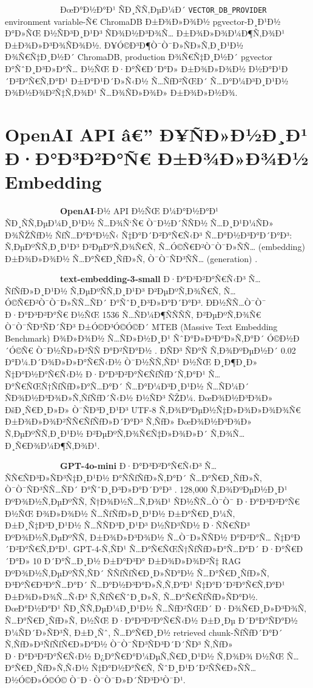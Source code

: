 \documentclass[12pt,A4]{report}
\begin{document}
\ \ \ \ \ \ \ \ \  \ \ \ \ ÐœÐ°Ð½Ð°Ð¹ ÑÐ¸ÑÑ‚ÐµÐ¼Ð´ \texttt{VECTOR\_DB\_PROVIDER}
environment variable-Ñ€ ChromaDB Ð±Ð¾Ð»Ð¾Ð½ pgvector-Ð¸Ð¹Ð½ Ð°Ð»ÑŒ Ð½ÑÐ³Ð¸Ð¹Ð³
ÑÐ¾Ð½Ð³Ð¾Ñ… Ð±Ð¾Ð»Ð¾Ð¼Ð¶Ñ‚Ð¾Ð¹ Ð±Ð¾Ð»Ð³Ð¾ÑÐ¾Ð½. Ð¥Ó©Ð³Ð¶Ò¯Ò¯Ð»ÑÐ»Ñ‚Ð¸Ð¹Ð½ Ð¾Ñ€Ñ‡Ð¸Ð½Ð´ ChromaDB,
production Ð¾Ñ€Ñ‡Ð¸Ð½Ð´ pgvector Ð°ÑˆÐ¸Ð³Ð»Ð°Ñ… Ð½ÑŒ Ð·Ð°Ñ€Ð´Ð°Ð» Ð±Ð¾Ð»Ð¾Ð½ Ð½Ð°Ð¹Ð´Ð²Ð°Ñ€Ñ‚Ð°Ð¹
Ð±Ð°Ð¹Ð´Ð»Ñ‹Ð½ Ñ…ÑƒÐ²ÑŒÐ´ Ñ…Ð°Ð¼Ð³Ð¸Ð¹Ð½ Ð¾Ð½Ð¾Ð²Ñ‡Ñ‚Ð¾Ð¹ Ñ…Ð¾ÑÐ»Ð¾Ð» Ð±Ð¾Ð»Ð½Ð¾.

\section{OpenAI API â€” Ð¥ÑÐ»Ð½Ð¸Ð¹ Ð·Ð°Ð³Ð²Ð°Ñ€ Ð±Ð¾Ð»Ð¾Ð½ Embedding}

\ \ \ \ \ \ \ \ \  \ \ \ \ \textbf{OpenAI}-Ð½ API Ð½ÑŒ Ð¼Ð°Ð½Ð°Ð¹ ÑÐ¸ÑÑ‚ÐµÐ¼Ð¸Ð¹Ð½
Ñ…Ð¾Ñ‘Ñ€ Ò¯Ð½Ð´ÑÑÐ½ Ñ…Ð¸Ð¹Ð¼ÑÐ» Ð¾ÑŽÑƒÐ½ ÑƒÑ…Ð°Ð°Ð½Ñ‹ Ñ‡Ð°Ð´Ð²Ð°Ñ€Ñ‹Ð³ Ñ…Ð°Ð½Ð³Ð°Ð´Ð°Ð³: Ñ‚ÐµÐºÑÑ‚Ð¸Ð¹Ð³
Ð²ÐµÐºÑ‚Ð¾Ñ€Ñ‚ Ñ…Ó©Ñ€Ð²Ò¯Ò¯Ð»ÑÑ… (embedding) Ð±Ð¾Ð»Ð¾Ð½ Ñ…Ð°Ñ€Ð¸ÑƒÐ»Ñ‚ Ò¯Ò¯ÑÐ³ÑÑ… (generation)
\cite{openai2024embedding}.

\ \ \ \ \ \ \ \ \  \ \ \ \ \textbf{text-embedding-3-small} Ð·Ð°Ð³Ð²Ð°Ñ€Ñ‹Ð³
Ñ…ÑƒÑƒÐ»Ð¸Ð¹Ð½ Ñ‚ÐµÐºÑÑ‚Ð¸Ð¹Ð³ Ð²ÐµÐºÑ‚Ð¾Ñ€Ñ‚ Ñ…Ó©Ñ€Ð²Ò¯Ò¯Ð»ÑÑ…ÑÐ´ Ð°ÑˆÐ¸Ð³Ð»Ð°Ð´Ð°Ð³. Ð­Ð½ÑÑ…Ò¯Ò¯ Ð·Ð°Ð³Ð²Ð°Ñ€ Ð½ÑŒ
1536 Ñ…ÑÐ¼Ð¶ÑÑÑÑ‚ Ð²ÐµÐºÑ‚Ð¾Ñ€ Ò¯Ò¯ÑÐ³ÑÐ´ÑÐ³ Ð±Ó©Ð³Ó©Ó©Ð´ MTEB (Massive Text Embedding
Benchmark) Ð¾Ð»Ð¾Ð½ Ñ…ÑÐ»Ð½Ð¸Ð¹ ÑˆÐ°Ð»Ð³Ð°Ð»Ñ‚Ð°Ð´ Ó©Ð½Ð´Ó©Ñ€ Ò¯Ð½ÑÐ»Ð³ÑÑ Ð°Ð²ÑÐ°Ð½
\cite{openai2024embedding}. ÐÑÐ³ ÑÐ°Ñ Ñ‚Ð¾ÐºÐµÐ½Ð´ 0.02 Ð°Ð¼.Ð´Ð¾Ð»Ð»Ð°Ñ€Ñ‹Ð½
Ò¯Ð½ÑÑ‚ÑÐ¹ Ð½ÑŒ Ð¸Ð¶Ð¸Ð» Ñ‡Ð°Ð½Ð°Ñ€Ñ‹Ð½ Ð·Ð°Ð³Ð²Ð°Ñ€ÑƒÑƒÐ´Ñ‚Ð°Ð¹ Ñ…Ð°Ñ€ÑŒÑ†ÑƒÑƒÐ»Ð°Ñ…Ð°Ð´ Ñ…Ð°Ð¼Ð³Ð¸Ð¹Ð½ Ñ…ÑÐ¼Ð´
ÑÐ¾Ð½Ð³Ð¾Ð»Ñ‚ÑƒÑƒÐ´Ñ‹Ð½ Ð½ÑÐ³ ÑŽÐ¼. ÐœÐ¾Ð½Ð³Ð¾Ð» ÐšÐ¸Ñ€Ð¸Ð»Ð» Ò¯ÑÐ³Ð¸Ð¹Ð³ UTF-8 Ñ‚Ð¾ÐºÐµÐ½Ñ‡Ð»Ð¾Ð»Ð¾Ð¾Ñ€
Ð±Ð¾Ð»Ð¾Ð²ÑÑ€ÑƒÑƒÐ»Ð´Ð°Ð³ Ñ‚ÑƒÐ» ÐœÐ¾Ð½Ð³Ð¾Ð» Ñ‚ÐµÐºÑÑ‚Ð¸Ð¹Ð½ Ð²ÐµÐºÑ‚Ð¾Ñ€Ñ‡Ð»Ð¾Ð»Ð´ Ñ‚Ð¾Ñ…Ð¸Ñ€Ð¾Ð¼Ð¶Ñ‚Ð¾Ð¹.

\ \ \ \ \ \ \ \ \  \ \ \ \ \textbf{GPT-4o-mini} Ð·Ð°Ð³Ð²Ð°Ñ€Ñ‹Ð³ Ñ…ÑÑ€ÑÐ³Ð»ÑÐ³Ñ‡Ð¸Ð¹Ð½
Ð°ÑÑƒÑƒÐ»Ñ‚Ð°Ð´ Ñ…Ð°Ñ€Ð¸ÑƒÐ»Ñ‚ Ò¯Ò¯ÑÐ³ÑÑ…ÑÐ´ Ð°ÑˆÐ¸Ð³Ð»Ð°Ð´Ð°Ð³ \cite{openai2024gpt4o}.
128,000 Ñ‚Ð¾ÐºÐµÐ½Ð¸Ð¹ ÐºÐ¾Ð½Ñ‚ÐµÐºÑÑ‚ Ñ†Ð¾Ð½Ñ…Ñ‚Ð¾Ð¹ ÑÐ½ÑÑ…Ò¯Ò¯ Ð·Ð°Ð³Ð²Ð°Ñ€ Ð½ÑŒ Ð¾Ð»Ð¾Ð½ Ñ…ÑƒÑƒÐ»Ð¸Ð¹Ð½
Ð±Ð°Ñ€Ð¸Ð¼Ñ‚ Ð±Ð¸Ñ‡Ð³Ð¸Ð¹Ð½ Ñ…ÑÑÐ³Ð¸Ð¹Ð³ Ð½ÑÐ³ÑÐ½ Ð·ÑÑ€ÑÐ³ ÐºÐ¾Ð½Ñ‚ÐµÐºÑÑ‚ Ð±Ð¾Ð»Ð³Ð¾Ð½ Ñ…Ò¯Ð»ÑÑÐ½ Ð°Ð²Ð°Ñ…
Ñ‡Ð°Ð´Ð²Ð°Ñ€Ñ‚Ð°Ð¹. GPT-4-Ñ‚ÑÐ¹ Ñ…Ð°Ñ€ÑŒÑ†ÑƒÑƒÐ»Ð°Ñ…Ð°Ð´ Ð·Ð°Ñ€Ð´Ð°Ð» 10 Ð´Ð°Ñ…Ð¸Ð½ Ð±Ð°Ð³Ð° Ð±Ð¾Ð»Ð¾Ð²Ñ‡
RAG ÐºÐ¾Ð½Ñ‚ÐµÐºÑÑ‚ÑÐ´ ÑÑƒÑƒÑ€Ð¸Ð»ÑÐ°Ð½ Ñ…Ð°Ñ€Ð¸ÑƒÐ»Ñ‚ Ð³Ð°Ñ€Ð³Ð°Ñ…Ð°Ð´ Ñ…Ð°Ð½Ð³Ð°Ð»Ñ‚Ñ‚Ð°Ð¹ Ñ‡Ð°Ð´Ð²Ð°Ñ€Ñ‚Ð°Ð¹
Ð±Ð¾Ð»Ð¾Ñ…Ñ‹Ð³ Ñ‚ÑƒÑ€ÑˆÐ¸Ð»Ñ‚ Ñ…Ð°Ñ€ÑƒÑƒÐ»ÑÐ°Ð½. ÐœÐ°Ð½Ð°Ð¹ ÑÐ¸ÑÑ‚ÐµÐ¼Ð¸Ð¹Ð½ Ñ…ÑƒÐ²ÑŒÐ´ Ð·Ð¾Ñ€Ð¸Ð»Ð³Ð¾Ñ‚ Ñ…Ð°Ñ€Ð¸ÑƒÐ»Ñ‚
Ð½ÑŒ Ð·Ð°Ð³Ð²Ð°Ñ€Ñ‹Ð½ Ð±Ð¸Ðµ Ð´Ð°Ð°ÑÐ°Ð½ Ð¼ÑÐ´Ð»ÑÐ³Ñ‚ Ð±Ð¸Ñˆ, Ñ…Ð°Ñ€Ð¸Ð½ retrieved chunk-ÑƒÑƒÐ´Ð°Ð´
Ñ‚ÑƒÐ»Ð³ÑƒÑƒÑ€Ð»Ð°Ð½ Ò¯Ò¯ÑÐ³ÑÐ³Ð´Ð´ÑÐ³ Ñ‚ÑƒÐ» Ð·Ð°Ð³Ð²Ð°Ñ€Ñ‹Ð½ Ð¿Ð°Ñ€Ð°Ð¼ÐµÑ‚Ñ€Ð¸Ð¹Ð½ Ñ‚Ð¾Ð¾ Ð½ÑŒ Ñ…Ð°Ñ€Ð¸ÑƒÐ»Ñ‚Ñ‹Ð½
Ñ‡Ð°Ð½Ð°Ñ€Ñ‚ ÑˆÐ¸Ð¹Ð´Ð²ÑÑ€Ð»ÑÑ… Ð½Ó©Ð»Ó©Ó© Ò¯Ð·Ò¯Ò¯Ð»Ð´ÑÐ³Ð³Ò¯Ð¹.
\end{document}
